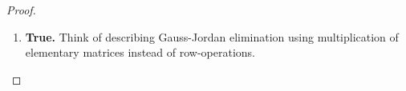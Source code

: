 \begin{exercise}
\begin{proof}
\begin{enumerate}
            \begin{proof}[proof of lemma]
                Let \( j_0 < n \). Then \( [UB]_{\cdot j_0} = U [B]_{\cdot j_0} \) yields
                \[
                \begin{cases}
                    \sum_{r=1}^n[U]_{1r}[B]_{r j_0} &= [UB]_{1 j_0} \\
                    \sum_{r=2}^n[U]_{2r}[B]_{r j_0} &= [UB]_{2 j_0} \\
                    \hspace{5mm}\vdots &\vdots\\
                    \sum_{r=j_0}^n[U]_{j_0r}[B]_{r j_0} &= [UB]_{j_0 j_0} \\
                    \sum_{r=j_0 + 1}^n[U]_{j_0+1 r}[B]_{r j_0} &= 0 \\
                    \hspace{5mm}\vdots &\vdots\\
                    [U]_{n-1 n-1}[B]_{n-1 j_0} + [B]_{n-1 n}[B]_{n j_0} &= 0 \\
                    [U]_{n n}[B]_{n j_0} &= 0
                \end{cases}
                \]
                Since \( U \) is invertible \( [U]_{ii} \neq 0 \) for all \( i \). Thus, the system above implies \( [B]_{n j_0} = [B]_{n-1 j_0} = \ldots = [B]_{j_0 + 1 j_0} = 0 \) so that \( B \) is upper-triangular.
            \end{proof}
            
            \begin{proof}[proof of exercise]
                If \( U \) is upper-triangular and invertible, then \( I = UU^{-1} \) is upper-triangular. Therefore, by our lemma, \( U^{-1} \) is upper-triangular.
            \end{proof}
            
            \item \textbf{True.} Think of describing Gauss-Jordan elimination using multiplication of elementary matrices instead of row-operations.
        \end{enumerate}
    \end{proof}
\end{exercise}